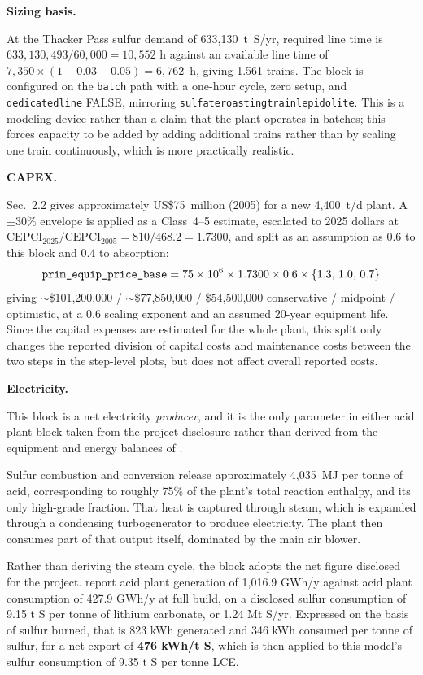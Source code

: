 \documentclass{article}
\renewcommand\_{\textunderscore\allowbreak}
\begin{document}
 
\medskip
\noindent\textbf{Sizing basis.}\quad
 
At the Thacker Pass sulfur demand of 633,130~t~S/yr, required line time is $633,130,493 / 60,000 = 10,552$ h against an available line time of $7,350 \times (1 - 0.03 - 0.05) = 6,762$~h, giving 1.561 trains. The block is configured on the \texttt{batch} path with a one-hour cycle, zero setup, and \texttt{dedicated\_line} FALSE, mirroring \texttt{sulfate\_roasting\_train\_lepidolite}. This is a modeling device rather than a claim that the plant operates in batches; this forces capacity to be added by adding additional trains rather than by scaling one train continuously, which is more practically realistic. 

\medskip
\noindent\textbf{CAPEX.}\quad
 
\citet{davenportSulfuricAcidManufacture2006} Sec.~2.2 gives approximately US\$75~million (2005) for a new 4,400~t/d plant. A $\pm$30\% envelope is applied as a Class~4--5 estimate, escalated to 2025 dollars at $\text{CEPCI}_{2025}/\text{CEPCI}_{2005} = 810/468.2 = 1.7300$, and split as an assumption as 0.6 to this block and 0.4 to absorption:
\[
    \texttt{prim\_equip\_price\_base} = 75 \times 10^6 \times 1.7300 \times 0.6 \times \{1.3,\, 1.0,\, 0.7\}
\]
giving $\sim$\$101,200,000 / $\sim$\$77,850,000 / \$54,500,000 conservative / midpoint / optimistic, at a 0.6 scaling exponent and an assumed 20-year equipment life. Since the capital expenses are estimated for the whole plant, this split only changes the reported division of capital costs and maintenance costs between the two steps in the step-level plots, but does not affect overall reported costs. 

\medskip
\noindent\textbf{Electricity.}\quad
 
This block is a net electricity \textit{producer}, and it is the only parameter in either acid plant block taken from the project disclosure rather than derived from the equipment and energy balances of \citet{davenportSulfuricAcidManufacture2006}.

Sulfur combustion and  conversion release approximately 4,035~MJ per tonne of acid, corresponding to roughly 75\% of the plant's total reaction enthalpy, and its only high-grade fraction. That heat is captured through steam, which is expanded through a condensing turbogenerator to produce electricity. The plant then consumes part of that output itself, dominated by the main air blower.

Rather than deriving the steam cycle, the block adopts the net figure disclosed for the project. \citet{sgscanadaincSK1300Technical2024} report acid plant generation of 1,016.9 GWh/y against acid plant consumption of 427.9 GWh/y at full build, on a disclosed sulfur consumption of 9.15 t S per tonne of lithium carbonate, or 1.24 Mt S/yr. Expressed on the basis of sulfur burned, that is 823 kWh generated and 346 kWh consumed per tonne of sulfur, for a net export of \textbf{476 kWh/t S}, which is then applied to this model's sulfur consumption of 9.35 t S per tonne LCE. 
\end{document}
